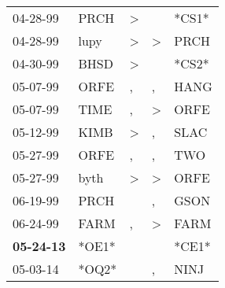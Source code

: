 \begin{supertabular}{p{0.07\textwidth}p{0.06\textwidth}p{0.02\textwidth}p{0.02\textwidth}p{0.06\textwidth}}
          04-28-99\textsuperscript{} &  PRCH\textsuperscript{} &  \textgreater &               &                   *CS1* \\
          04-28-99\textsuperscript{} &  lupy\textsuperscript{} &  \textgreater &  \textgreater &  PRCH\textsuperscript{} \\
          04-30-99\textsuperscript{} &  BHSD\textsuperscript{} &  \textgreater &               &                   *CS2* \\
          05-07-99\textsuperscript{} &  ORFE\textsuperscript{} &             , &             , &  HANG\textsuperscript{} \\
          05-07-99\textsuperscript{} &  TIME\textsuperscript{} &             , &  \textgreater &  ORFE\textsuperscript{} \\
          05-12-99\textsuperscript{} &  KIMB\textsuperscript{} &  \textgreater &             , &  SLAC\textsuperscript{} \\
          05-27-99\textsuperscript{} &  ORFE\textsuperscript{} &             , &             , &   TWO\textsuperscript{} \\
          05-27-99\textsuperscript{} &  byth\textsuperscript{} &  \textgreater &  \textgreater &  ORFE\textsuperscript{} \\
          06-19-99\textsuperscript{} &  PRCH\textsuperscript{} &               &             , &  GSON\textsuperscript{} \\
          06-24-99\textsuperscript{} &  FARM\textsuperscript{} &             , &  \textgreater &  FARM\textsuperscript{} \\
 \textbf{05-24-13\textsuperscript{}} &                   *OE1* &               &               &                   *CE1* \\
          05-03-14\textsuperscript{} &                   *OQ2* &               &             , &  NINJ\textsuperscript{} \\
\end{supertabular}
